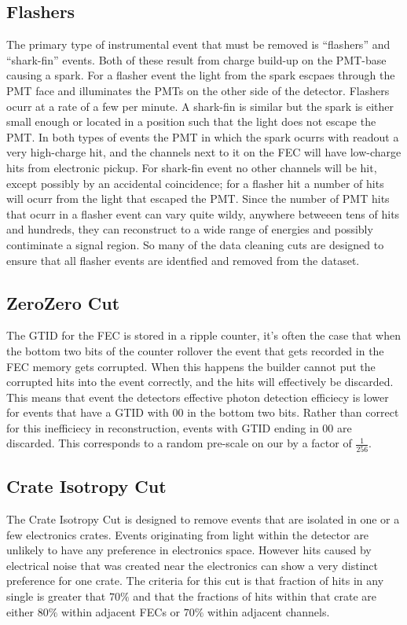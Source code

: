 \subsection{Flashers}
The primary type of instrumental event that must be removed is ``flashers'' and
``shark-fin'' events.
Both of these result from charge build-up on the PMT-base causing a
spark.
For a flasher event the light from the spark escpaes through the PMT face
and illuminates the PMTs on the other side of the detector.
Flashers ocurr at a rate of a few per minute.
A shark-fin is similar but the spark is either small enough or located
in a position such that the light does not escape the PMT.
In both types of events the PMT in which the spark ocurrs with readout
a very high-charge hit, and the channels next to it on the FEC will
have low-charge hits from electronic pickup.
For shark-fin event no other channels will be hit, except possibly by an
accidental coincidence; for a flasher hit a number of hits will
ocurr from the light that escaped the PMT.
Since the number of PMT hits that ocurr in a flasher event can vary quite wildy,
anywhere betweeen tens of hits and hundreds, they can reconstruct
to a wide range of energies and possibly contiminate a signal region.
So many of the data cleaning cuts are designed to ensure that all
flasher events are identfied and removed from the dataset.

\subsection{ZeroZero Cut}
The GTID for the FEC is stored in a ripple counter, it's often the case that
when the bottom two bits of the counter rollover the event that gets recorded in
the FEC memory gets corrupted.
When this happens the builder cannot put the corrupted hits into the event correctly,
and the hits will effectively be discarded.
This means that event the detectors effective photon detection efficiecy is lower
for events that have a GTID with $00$ in the bottom two bits.
Rather than correct for this inefficiecy in reconstruction, events with GTID
ending in $00$ are discarded. This corresponds to a random pre-scale
on our by a factor of $\frac{1}{256}$.
\subsection{Crate Isotropy Cut}
The Crate Isotropy Cut is designed to remove events that are isolated
in one or a few electronics crates.
Events originating from light within the detector are unlikely to have any
preference in electronics space.
However hits caused by electrical noise that was created near the electronics
can show a very distinct preference for one crate.
The criteria for this cut is that fraction of hits in any single
is greater that $70\%$ and that the fractions of hits within
that crate are either $80\%$ within adjacent FECs or $70\%$ within
adjacent channels.
